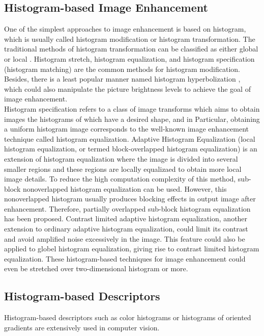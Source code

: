 \documentclass{article}
\begin{document}
\subsection{Histogram-based Image Enhancement}
One of the simplest approaches to image enhancement is based on histogram, which is usually called histogram modification or histogram transformation. The traditional methods of histogram transformation can be classified as either global\cite{Modification1978,Sapiro1997,Arici2009} or local \cite{Caselles1999}. Histogram stretch\cite{Alparslan1981}, histogram equalization\cite{Kundu1998}, and histogram specification (histogram matching)\cite{Coltuc2006,Wan2007,Mignotte2011,Sen2011} are the common methods for histogram modification. Besides, there is a least popular manner named histogram hyperbolization \cite{Nahin1979}, which could also manipulate the picture brightness levels to achieve the goal of image enhancement.\\
Histogram specification refers to a class of image transforms which aims to obtain images the histograms of which have a desired shape, and in Particular, obtaining a uniform histogram image corresponds to the well-known image enhancement technique called histogram equalization. Adaptive Histogram Equalization (local histogram equalization, or termed block-overlapped histogram equalization) is an extension of histogram equalization where the image is divided into several smaller regions and these regions are locally equalizaed to obtain more local image details. To reduce the high computation complexity of this method, sub-block nonoverlapped histogram equalization can be used. However, this nonoverlapped histogram usually produces blocking effects in output image after enhancement. Therefore, partially overlapped sub-block histogram equalization has been proposed\cite{Kim2001}. Contrast limited adaptive histogram equalization,	another extension to ordinary adaptive histogram equalization,  could limit its contrast and avoid amplified noise excessively in the image\cite{Zhu1999}. This feature could also be applied to globel histogram equalization, giving rise to contrast limited histogram equalization. These histogram-based techniques for image enhancement could even be stretched over two-dimensional histogram or more\cite{Celik2012}.
\subsection{Histogram-based Descriptors}
Histogram-based descriptors such as color histograms or histograms of oriented gradients are extensively used in computer vision.
\end{document}
